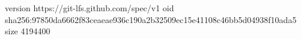 version https://git-lfs.github.com/spec/v1
oid sha256:97850da6662f83ceaeae936c190a2b32509ec15e41108c46bb5d04938f10ada5
size 4194400
